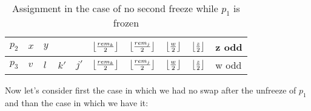 \begin{itemize}
    \begin{table}[h]
        \begin{tabular}{|l|l|l|l|l|l|l|l|l|l|}
            \hline
            $p_2$ & $x$ & $y$ &      &    &   $\left \lfloor\frac{rem_k}{2}\right \rfloor$ & $\left \lfloor\frac{rem_j}{2}\right \rfloor$ & $\left \lfloor\frac{w}{2}\right \rfloor$ & $\left \lfloor\frac{z}{2}\right \rfloor$ & z odd \\ \hline
            $p_3$ & $v$ & $l$ & $k'$ & $j'$ & $\left \lfloor\frac{rem_k}{2}\right \rfloor$ & $\left \lfloor\frac{rem_j}{2}\right \rfloor$ & $\left \lfloor\frac{w}{2}\right \rfloor$ & $\left \lfloor\frac{z}{2}\right \rfloor$ & w odd \\ \hline
        \end{tabular}
        \caption{Assignment in the case of no second freeze while $p_1$ is frozen}
        \label{table:abb-abb-abb-assignment-in-the-case-of-no-second-freeze}
    \end{table}
    
\end{itemize}

Now let's consider first the case in which we had no swap after the unfreeze of $p_1$ and than the case in which we have it:

